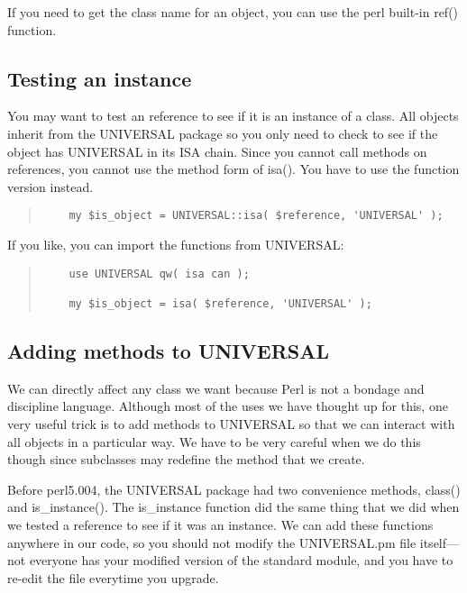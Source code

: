 If you need to get the class name for an object, you can use the
perl built-in ref() function.

        \subsection{Testing an instance}
        
You may want to test an reference to see if it is an instance of a 
class.  All objects inherit from the UNIVERSAL package so you
only need to check to see if the object has UNIVERSAL in its
ISA chain.  Since you cannot call methods on references, you
cannot use the method form of isa().  You have to use the
function version instead.

\begin{quote}
\begin{verbatim}
	my $is_object = UNIVERSAL::isa( $reference, 'UNIVERSAL' );
\end{verbatim}
\end{quote}

If you like, you can import the functions from UNIVERSAL:

\begin{quote}
\begin{verbatim}
	use UNIVERSAL qw( isa can );
	
	my $is_object = isa( $reference, 'UNIVERSAL' );
\end{verbatim}
\end{quote}
	

        \subsection{Adding methods to UNIVERSAL}
        
We can directly affect any class we want because Perl is not a bondage
and discipline language.  Although most of the uses we have thought up
for this, one very useful trick is to add methods to UNIVERSAL so that
we can interact with all objects in a particular way.  We have to be
very careful when we do this though since subclasses may redefine the
method that we create.

Before perl5.004, the UNIVERSAL package had two convenience methods,
class() and is\_instance().  The is\_instance function did the same
thing that we did when we tested a reference to see if it was an
instance.  We can add these functions anywhere in our code, so
you should not modify the UNIVERSAL.pm file itself---not everyone
has your modified version of the standard module, and you have to
re-edit the file everytime you upgrade.

